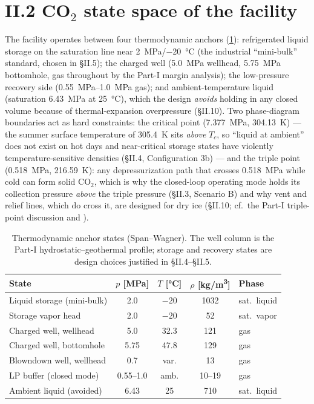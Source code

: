 \section{II.2 CO$_2$ state space of the facility}

The facility operates between four thermodynamic anchors
(\cref{tab:anchors}): refrigerated liquid storage on the saturation
line near \SI{2}{MPa}/\SI{-20}{\celsius} (the industrial
``mini-bulk'' standard, chosen in \S II.5); the charged well
(\SI{5.0}{MPa} wellhead, \SI{5.75}{MPa} bottomhole, gas throughout by
the Part-I margin analysis); the low-pressure recovery side
(\SIrange{0.55}{1.0}{MPa} gas); and ambient-temperature liquid
(saturation \SI{6.43}{MPa} at \SI{25}{\celsius}), which the design
\emph{avoids} holding in any closed volume because of
thermal-expansion overpressure (\S II.10). Two phase-diagram
boundaries act as hard constraints: the critical point
(\SI{7.377}{MPa}, \SI{304.13}{K}) --- the summer surface temperature
of \SI{305.4}{K} sits \emph{above} $T_c$, so ``liquid at ambient''
does not exist on hot days and near-critical storage states have
violently temperature-sensitive densities (\S II.4, Configuration 3b)
--- and the triple point (\SI{0.518}{MPa}, \SI{216.59}{K}): any
depressurization path that crosses \SI{0.518}{MPa} while cold can
form solid CO$_2$, which is why the closed-loop operating mode holds
its collection pressure \emph{above} the triple pressure
(\S II.3, Scenario B) and why vent and relief lines, which do cross
it, are designed for dry ice (\S II.10; cf.\ the Part-I triple-point
discussion and \citealp{martynov2018}).

\begin{table}[htb]
\centering
\caption{Thermodynamic anchor states (Span--Wagner). The well column
is the Part-I hydrostatic--geothermal profile; storage and recovery
states are design choices justified in \S II.4--\S II.5.}
\label{tab:anchors}
\begin{tabular}{lcccl}
\toprule
State & $p$ [MPa] & $T$ [\si{\celsius}] & $\rho$ [\si{kg/m^3}] &
Phase \\
\midrule
Liquid storage (mini-bulk) & 2.0 & $-20$ & 1032 & sat.\ liquid \\
Storage vapor head & 2.0 & $-20$ & 52 & sat.\ vapor \\
Charged well, wellhead & 5.0 & 32.3 & 121 & gas \\
Charged well, bottomhole & 5.75 & 47.8 & 129 & gas \\
Blowndown well, wellhead & 0.7 & var. & 13 & gas \\
LP buffer (closed mode) & 0.55--1.0 & amb. & 10--19 & gas \\
Ambient liquid (avoided) & 6.43 & 25 & 710 & sat.\ liquid \\
\bottomrule
\end{tabular}
\end{table}

